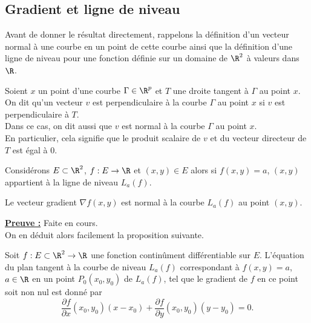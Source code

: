 \documentclass[class=report,crop=false]{standalone}
\begin{document}
\subsection{Gradient et ligne de niveau}
\noindent Avant de donner le résultat directement, rappelons la définition d'un vecteur normal à une courbe en un point de cette courbe ainsi que la définition d'une ligne de niveau pour une fonction définie sur un domaine de  $\R^2$ à valeurs dans $\R$.
\begin{definition}
\textcolor[rgb]{0.73,0.00,0.00}{
Soient $x$ un point d'une courbe $\Gamma \in \R^p$ et $T$ une droite tangent à $\Gamma$
au point $x$. On dit qu'un vecteur $v$ est perpendiculaire à la courbe $\Gamma$ au point $x$
si $v$ est perpendiculaire à $T$. \\
Dans ce cas, on dit aussi que $v$ est normal à la courbe $\Gamma$ au point $x$.\\
En particulier, cela signifie que le produit scalaire de $v$ et du vecteur directeur de
$T$ est égal à $0$.
}
 \end{definition}


\noindent Considérons $E \subset \R^2$, $f: E \rightarrow \R$ et $(x,y) \in E$ alors si 
$f(x,y)=a$, $(x,y)$ appartient à la ligne de niveau $L_a (f)$.

 \begin{proposition}
\textcolor[rgb]{0.50,0.00,0.25}{
Le vecteur gradient $\nabla f(x,y)$ est normal à la courbe $L_a(f)$ au point $(x,y)$.
}
\end{proposition}

\noindent \underline{\bf Preuve :}
Faite en cours.\\
$ $\\
\noindent On en déduit alors facilement la proposition suivante.

 \begin{proposition}
\textcolor[rgb]{0.50,0.00,0.25}{
Soit $f: E \subset  \R^2 \rightarrow \R$ une fonction continûment différentiable sur $E$.
L'équation du plan tangent à la courbe de niveau $L_a(f)$ correspondant à $f(x,y)=a$, $a \in \R$  en un point $P_0(x_0,y_0)$ de $L_a(f)$, tel que le gradient de $f$ en ce point soit non nul est donné par
\begin{equation*}
\dfrac{\partial f}{\partial x}(x_0,y_0)(x-x_0)+\dfrac{\partial f}{\partial y}(x_0,y_0)(y-y_0)=0.
\end{equation*}
 }
\end{proposition}
\end{document}
